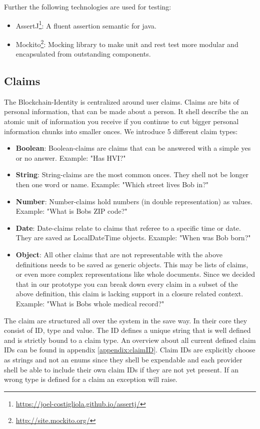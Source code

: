 Further the following technologies are used for testing:

\begin{itemize}
\item AssertJ\footnote{\url{https://joel-costigliola.github.io/assertj/}}: A fluent assertion semantic for java. 
\item Mockito\footnote{\url{http://site.mockito.org/}}: Mocking library to make unit and rest test more modular and encapsulated from outstanding components. 
\end{itemize}

\subsection{Claims}
The Blockchain-Identity is centralized around user claims. Claims are bits of personal information, that can be made about a person. It shell describe the an atomic unit of information you receive if you continue to cut bigger personal information chunks into smaller onces. We introduce 5 different claim types: 

\begin{itemize}
\item \textbf{Boolean}: Boolean-claims are claims that can be answered with a simple yes or no answer.
Example: "Has HVI?" 
\item \textbf{String}: String-claims are the most common onces. They shell not be longer then one word or name. 
Example: "Which street lives Bob in?"
\item \textbf{Number}: Number-claims hold numbers (in double representation) as values. 
Example: "What is Bobs ZIP code?"
\item \textbf{Date}: Date-claims relate to claims that referee to a specific time or date. They are saved as LocalDateTime objects.
Example: "When was Bob born?"  
\item \textbf{Object}: All other claims that are not representable with the above definitions needs to be saved as generic objects. This may be lists of claims, or even more complex representations like whole documents. Since we decided that in our prototype you can break down every claim in a subset of the above definition, this claim is lacking support in a closure related context. 
Example: "What is Bobs whole medical record?"
\end{itemize}

The claim are structured all over the system in the save way. In their core they consist of ID, type and value. The ID defines a unique string that is well defined and is strictly bound to a claim type. 
An overview about all current defined claim IDs can be found in appendix \ref{appendix:claimID}. Claim IDs are explicitly choose as strings and not an enums since they shell be expendable and each provider shell be able to include their own claim IDs if they are not yet present. If an wrong type is defined for a claim an exception will raise. 

